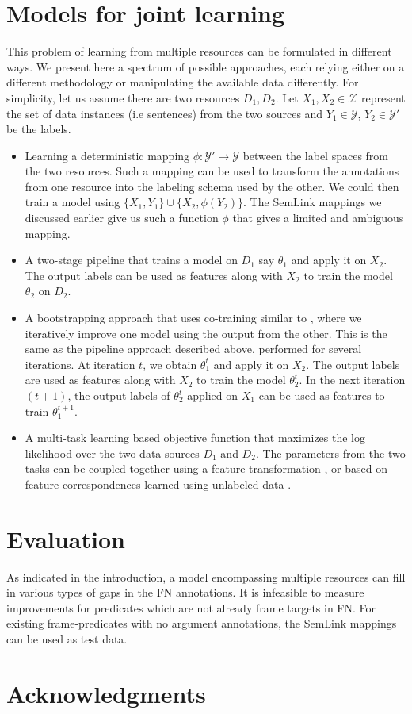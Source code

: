 \documentclass[11pt]{article}
\begin{document}
\section{Models for joint learning}
This problem of learning from multiple resources can be formulated in different ways. We present here a spectrum of possible approaches, each relying either on a different methodology or manipulating the available data differently. For simplicity, let us assume there are two resources $D_1, D_2$. Let $X_1, X_2 \in \mathcal{X}$ represent the set of data instances (i.e sentences) from the two sources and $Y_1 \in \mathcal{Y}$, $Y_2 \in \mathcal{Y}'$ be the labels.
\begin{itemize}
\item Learning a deterministic mapping $\phi : \mathcal{Y}' \rightarrow \mathcal{Y}$ between the label spaces from the two resources. Such a mapping can be used to transform the annotations from one resource into the labeling schema used by the other. We could then train a model using $\{X_1, Y_1\} \cup \{X_2, \phi(Y_2)\}$. The SemLink mappings we discussed earlier give us such a function $\phi$ that gives a limited and ambiguous mapping.
\item A two-stage pipeline that trains a model on $D_1$ say $\theta_1$ and apply it on $X_2$. The output labels can be used as features along with $X_2$ to train the model $\theta_2$ on $D_2$. 
\item A bootstrapping approach that uses co-training similar to \cite{clark03}, where we iteratively improve one model using the output from the other. This is the same as the pipeline approach described above, performed for several iterations. At iteration $t$, we obtain $\theta_1^t$ and apply it on $X_2$. The output labels are used as features along with $X_2$ to train the model $\theta_2^t$. In the next iteration $(t+1)$, the output labels of $\theta_2^t$ applied on $X_1$ can be used as features to train $\theta_1^{t+1}$.
\item A multi-task learning based objective function that maximizes the log likelihood over the two data sources $D_1$ and $D_2$. The parameters from the two tasks can be coupled together using a feature transformation \cite{mtfl}, or based on feature correspondences learned using unlabeled data \cite{scl}.
\end{itemize}

\section{Evaluation}
As indicated in the introduction, a model encompassing multiple resources can fill in various types of gaps in the FN annotations. It is infeasible to measure improvements for predicates which are not already frame targets in FN. For existing frame-predicates with no argument annotations, the SemLink mappings can be used as test data.

\section*{Acknowledgments}



\end{document}
